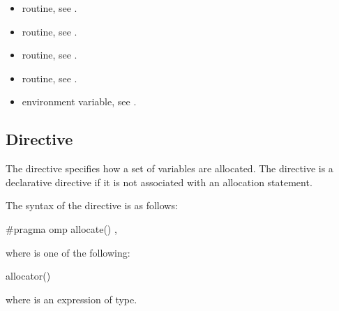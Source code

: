 \crossreferences
\begin{itemize}
\item {} routine, see .

\item {} routine, see .

\item {} routine, see .

\item {} routine, see .

\item {} environment variable, see .
\end{itemize}


\subsection{ Directive}
\label{subsec:allocate Directive}
\summary

The  directive specifies how a set of variables are allocated. The  directive is a declarative directive if it is not associated with an allocation statement.

\syntax
\begin{ccppspecific}
The syntax of the  directive is as follows:

\begin{ompcPragma}
#pragma omp allocate() \plc{[clause[ [ [},\plc{] clause] ... ]] new-line}
\end{ompcPragma}

where  is one of the following:

\begin{indentedcodelist}
allocator()
\end{indentedcodelist}

where  is an expression of  type.

\end{ccppspecific}
\medskip

